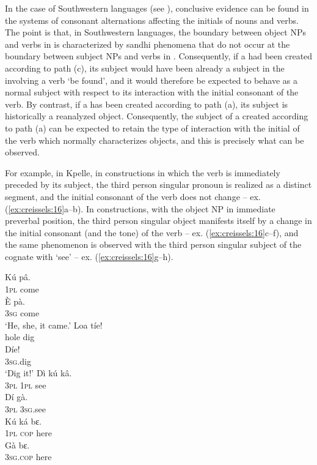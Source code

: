 \documentclass[output=paper]{langsci/langscibook}
\begin{document}
  In the case of Southwestern  languages (see ), conclusive evidence can be found in the systems of consonant alternations affecting the initials of nouns and verbs. The point is that, in Southwestern  languages, the boundary between object NPs and verbs in   is characterized by sandhi phenomena that do not occur at the boundary between subject NPs and verbs in  . Consequently, if a  had been created according to path (c), its subject would have been already a subject in the  involving a verb ‘be found’, and it would therefore be expected to behave as a normal subject with respect to its interaction with the initial consonant of the verb. By contrast, if a  has been created according to path (a), its subject is historically a reanalyzed object. Consequently, the subject of a  created according to path (a) can be expected to retain the type of interaction with the initial of the verb which normally characterizes objects, and this is precisely what can be observed.
  
  For example, in Kpelle, in  constructions in which the verb is immediately preceded by its subject, the third person singular pronoun is realized as a distinct segment, and the initial consonant of the verb does not change – ex. (\ref{ex:creissels:16}a--b). In  constructions, with the object NP in immediate preverbal position, the third person singular object manifests itself by a change in the initial consonant (and the tone) of the verb – ex. (\ref{ex:creissels:16}c--f), and the same phenomenon is observed with the third person singular subject of the  cognate with ‘see’ – ex. (\ref{ex:creissels:16}g--h).
  
\ea%
    \label{ex:creissels:16}
    
\ea
    \gll   Kú  pâ.\\
  \textsc{1pl}  come\\
\ex
    \gll   È  pà.\\
  \textsc{3sg}  come\\
  \glt ‘He, she, it came.’ 
\ex
    \gll   Loa  tíe!\\
  hole  dig\\
\ex
    \gll   Díe!\\
  \textsc{3sg}.dig\\
  \glt ‘Dig it!’
\ex
    \gll   Dì  kú  kâ.\\
  \textsc{3pl}  \textsc{1pl}  see\\
\ex
    \gll   Dí  gà.\\
  \textsc{3pl}  \textsc{3sg}.see\\
\ex
    \gll   Kú  ká  bɛ.\\
  \textsc{1pl}  \textsc{cop}  here\\
\ex
    \gll   Gà  bɛ.\\
  \textsc{3sg}.\textsc{cop}  here\\
\z
\z
\end{document}
